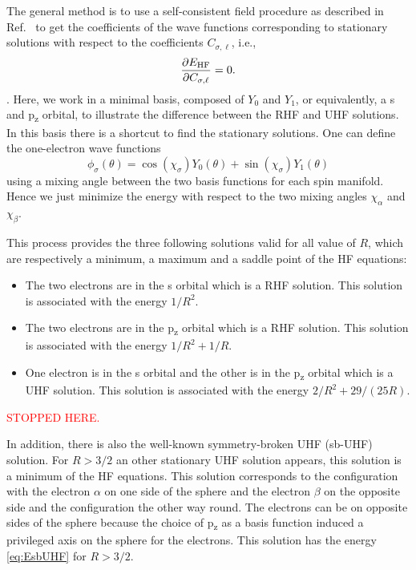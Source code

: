 \documentclass[11pt,a4paper]{article}
\newcommand{\titou}[1]{\textcolor{red}{#1}}
\begin{document}
The general method is to use a self-consistent field procedure as described in Ref.~\cite{SzaboBook} to get the coefficients of the wave functions corresponding to stationary solutions with respect to the coefficients $C_{\sigma,\ell}$, i.e.,
\begin{equation}
	\pdv{E_{\text{HF}}}{C_{\sigma,\ell}} = 0.
\end{equation}. 
Here, we work in a minimal basis, composed of $Y_{0}$ and $Y_{1}$, or equivalently, a s and p\textsubscript{z} orbital, to illustrate the difference between the RHF and UHF solutions. In this basis there is a shortcut to find the stationary solutions. One can define the one-electron wave functions 
\begin{equation}
	\phi_\sigma(\theta)= \cos(\chi_\sigma)Y_{0}(\theta) + \sin(\chi_\sigma)Y_{1}(\theta)
\end{equation}
using a mixing angle between the two basis functions for each spin manifold. 
Hence we just minimize the energy with respect to the two mixing angles $\chi_\alpha$ and $\chi_\beta$.
 
This process provides the three following solutions valid for all value of $R$, which are respectively a minimum, a maximum and a saddle point of the HF equations:
\begin{itemize}
\item The two electrons are in the s orbital which is a RHF solution. This solution is associated with the energy $1/R^{2}$.
\item The two electrons are in the p\textsubscript{z} orbital which is a RHF solution. This solution is associated with the energy $1/R^{2} + 1/R$.
\item One electron is in the s orbital and the other is in the p\textsubscript{z} orbital which is a UHF solution. This solution is associated with the energy $2/R^{2}+ 29/(25R)$.
\end{itemize}
\titou{STOPPED HERE.}

In addition, there is also the well-known symmetry-broken UHF (sb-UHF) solution. For $R>3/2$ an other stationary UHF solution appears, this solution is a minimum of the HF equations. This solution corresponds to the configuration with the electron $\alpha$ on one side of the sphere and the electron $\beta$ on the opposite side and the configuration the other way round. The electrons can be on opposite sides of the sphere because the choice of p\textsubscript{z} as a basis function induced a privileged axis on the sphere for the electrons. This solution has the energy \eqref{eq:EsbUHF} for $R>3/2$.
\end{document}

